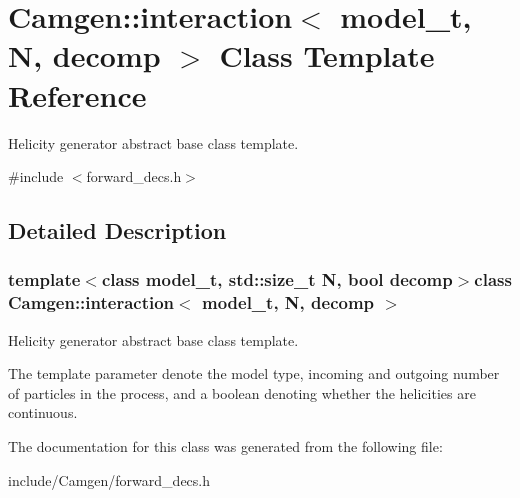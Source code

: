 \hypertarget{a00313}{}\section{Camgen\+:\+:interaction$<$ model\+\_\+t, N, decomp $>$ Class Template Reference}
\label{a00313}


Helicity generator abstract base class template.  




{\ttfamily \#include $<$forward\+\_\+decs.\+h$>$}



\subsection{Detailed Description}
\subsubsection*{template$<$class model\+\_\+t, std\+::size\+\_\+t N, bool decomp$>$class Camgen\+::interaction$<$ model\+\_\+t, N, decomp $>$}

Helicity generator abstract base class template. 

The template parameter denote the model type, incoming and outgoing number of particles in the process, and a boolean denoting whether the helicities are continuous. 

The documentation for this class was generated from the following file\+:\begin{DoxyCompactItemize}
\item 
include/\+Camgen/forward\+\_\+decs.\+h\end{DoxyCompactItemize}
